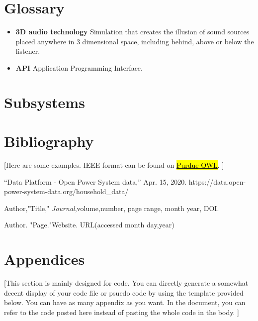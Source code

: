 \documentclass[letterpaper, 11pt]{article}
\begin{document}
\clearpage
\section*{Glossary} %
\begin{itemize} %
    \item \textbf{3D audio technology} Simulation that creates
          the illusion of sound sources placed anywhere in 3
          dimensional space, including behind, above or below the listener.
    \item \textbf{API} Application Programming Interface.
\end{itemize}




\section{Subsystems}








\clearpage
\section{Bibliography}

 [Here are some examples. IEEE format can be found on \href{https://owl.purdue.edu/owl/research_and_citation/ieee_style/ieee_overview.html}{\hl{Purdue OWL}}. ]

\begin{thebibliography}{}

    “Data Platform - Open Power System data,” Apr. 15, 2020. https://data.open-power-system-data.org/household\_data/

    Author,"Title," \emph{Journal},volume,number, page range, month year, DOI.

    Author. "Page."Website. URL(accessed month day,year)

\end{thebibliography}

\clearpage
\section{Appendices}
 [This section is mainly designed for code. You can directly generate a somewhat decent display of your code file or psuedo code by using the template provided below. You can have as many appendix as you want. In the document, you can refer to the code posted here instead of pasting the whole code in the body. ]
\end{document}
